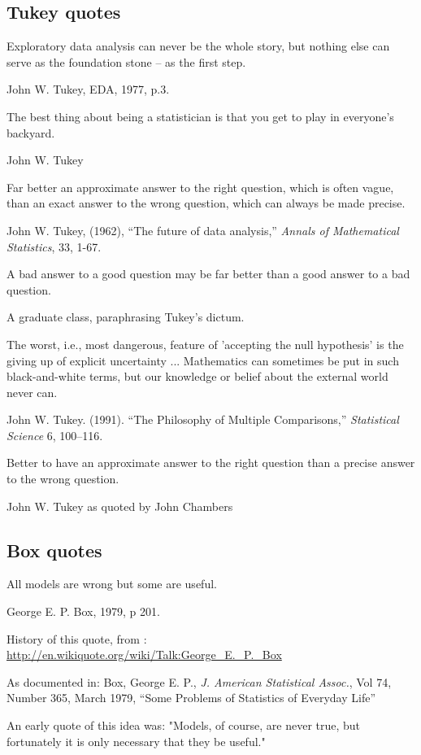 \subsection{Tukey quotes}

\epigraph{Exploratory data analysis can never be the whole story, but nothing else	can serve as the foundation stone -- as the first step.}{John W. Tukey, EDA, 1977, p.3.} 


\epigraph{The best thing about being a statistician is that you get to play in everyone's backyard.}{John W. Tukey}

\epigraph{Far better an approximate answer to the right question, which is often vague, than an exact answer to the wrong question, which can always be made precise.}{John W. Tukey, (1962), ``The future of data analysis,'' \emph{Annals of Mathematical Statistics}, 33, 1-67.}

\epigraph{A bad answer to a good question may be far better than a good answer to a bad question.}{A graduate class, paraphrasing Tukey's dictum.}

\epigraph{The worst, i.e., most dangerous, feature of 'accepting the null hypothesis' is the giving up of explicit uncertainty ... Mathematics can sometimes be put in such black-and-white terms, but our knowledge or belief about the external world never can.}{John W. Tukey. (1991). ``The Philosophy of Multiple Comparisons,'' \emph{Statistical Science} 6, 100--116.}

\epigraph{Better to have an approximate answer to the right question than a precise answer to the wrong question.}{John W. Tukey as quoted by John Chambers}


\subsection{Box quotes}

\epigraph{All models are wrong but some are useful.}{George E. P. Box, 1979, p 201.}

History of this quote, from : \url{http://en.wikiquote.org/wiki/Talk:George_E._P._Box}

As documented in: Box, George E. P., \emph{J. American Statistical Assoc.}, Vol 74, Number 365, March 1979, ``Some Problems of Statistics of Everyday Life''

An early quote of this idea was: "Models, of course, are never true, but fortunately it is only necessary that they be useful."

